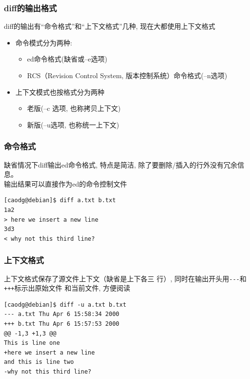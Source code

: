 \documentclass[compress]{beamer}
\begin{document}
\begin{frame}
\frametitle{diff的输出格式}
diff的输出有``命令格式''和``上下文格式''几种, 现在大都使用上下文格式
\begin{itemize}
\item 命令模式分为两种:
    \begin{itemize}
    \item ed命令格式(缺省或--e选项)
    \item RCS（Revision Control System, 版本控制系统）命令格式(--n选项)
    \end{itemize}
\item 上下文模式也按格式分为两种
    \begin{itemize}
    \item 老版(--c 选项, 也称拷贝上下文)
    \item 新版(--u选项, 也称统一上下文)
    \end{itemize}
\end{itemize}

\end{frame}

\begin{frame}[containsverbatim]
\frametitle{命令格式}

缺省情况下\alert{diff}输出ed命令格式, 特点是简洁, 除了要删除/插入的行外没有冗余信息。\\
输出结果可以直接作为ed的命令控制文件\\[1ex]
\begin{Verbatim}
[caodg@debian]$ diff a.txt b.txt
1a2
> here we insert a new line
3d3
< why not this third line?
\end{Verbatim}

\end{frame}

\begin{frame}[containsverbatim]
\frametitle{上下文格式}

上下文格式保存了源文件上下文（缺省是上下各三
行）, 同时在输出开头用\verb~---~和\verb~+++~标示出原始文件
和当前文件, 方便阅读\\[1ex]
{\small
\begin{Verbatim}
[caodg@debian]$ diff -u a.txt b.txt
--- a.txt Thu Apr 6 15:58:34 2000
+++ b.txt Thu Apr 6 15:57:53 2000
@@ -1,3 +1,3 @@
This is line one
+here we insert a new line
and this is line two
-why not this third line?
\end{Verbatim}
}

\end{frame}
\end{document}
